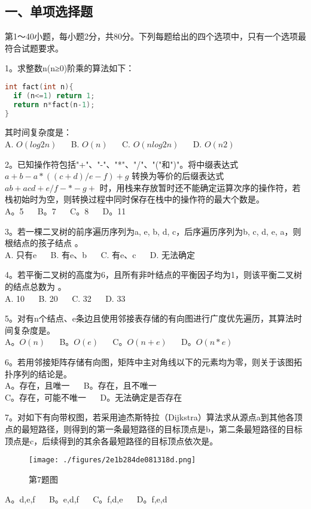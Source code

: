 
\subsection{一、单项选择题}
第1～40小题，每小题2分，共80分。下列每题给出的四个选项中，只有一个选项最符合试题要求。

1。求整数n(n≥0)阶乘的算法如下： \\
\begin{lstlisting}[language=cpp]
int fact(int n){
  if (n<=1) return 1;
  return n*fact(n-1);
}
\end{lstlisting}
其时间复杂度是：\\
A. $O(log2n)$ $\quad$ B. $O(n)$ $\quad$ C. $O(nlog2n)$ $\quad$ D. $O(n2)$

2。已知操作符包括"+"、"-"、"*"、"/"、"("和")"。将中缀表达式 $a+b-a*((c+d)/e-f)+g$ 转换为等价的后缀表达式 $ab+acd+e/f-*-g+$ 时，用栈来存放暂时还不能确定运算次序的操作符，若栈初始时为空，则转换过程中同时保存在栈中的操作符的最大个数是。 \\
A。5 $\quad$ B。7 $\quad$ C。8 $\quad$ D。11

3。若一棵二叉树的前序遍历序列为a, e, b, d, c，后序遍历序列为b, c, d, e, a，则根结点的孩子结点 。 \\
A. 只有e $\quad$ B. 有e、b $\quad$ C. 有e、c $\quad$ D. 无法确定

4。若平衡二叉树的高度为6，且所有非叶结点的平衡因子均为1，则该平衡二叉树的结点总数为 。 \\
A. 10 $\quad$ B. 20 $\quad$ C. 32 $\quad$ D. 33

5。对有n个结点、e条边且使用邻接表存储的有向图进行广度优先遍历，其算法时间复杂度是。\\
A。$O(n)$ $\quad$ B。$O(e)$ $\quad$ C。$O(n+e)$ $\quad$ D。$O(n*e)$

6。若用邻接矩阵存储有向图，矩阵中主对角线以下的元素均为零，则关于该图拓扑序列的结论是。\\
A。存在，且唯一 $\quad$ B。存在，且不唯一\\
C。存在，可能不唯一 $\quad$ D。无法确定是否存在

7。对如下有向带权图，若采用迪杰斯特拉（Dijkstra）算法求从源点a到其他各顶点的最短路径，则得到的第一条最短路径的目标顶点是b，第二条最短路径的目标顶点是c，后续得到的其余各最短路径的目标顶点依次是。\\
\begin{figure}[ht]
\centering
\texttt{[image: ./figures/2e1b284de081318d.png]}
\caption{第7题图} \label{fig_CSN12_1}
\end{figure}
A。d,e,f $\quad$ B。e,d,f $\quad$ C。f,d,e $\quad$ D。f,e,d

